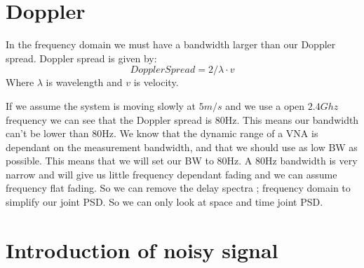 \section{Doppler}
In the frequency domain we must have a bandwidth larger than our Doppler spread. Doppler spread is given by:
\begin{equation}
Doppler Spread = 2/\lambda \cdot v
\end{equation}
Where $\lambda$ is wavelength and $v$ is velocity.

If we assume the system is moving slowly at $5m/s$ and we use a open $2.4Ghz$ frequency we can see that the Doppler spread is 80Hz. This means our bandwidth can't be lower than 80Hz. We know that the dynamic range of a VNA is dependant on the measurement bandwidth, and that we should use as low BW as possible. This means that we will set our BW to 80Hz. A 80Hz bandwidth is very narrow and will give us little frequency dependant fading and we can assume frequency flat fading. So we can remove the delay spectra ; frequency domain to simplify our joint PSD. So we can only look at space and time joint PSD.

\section{Introduction of noisy signal}